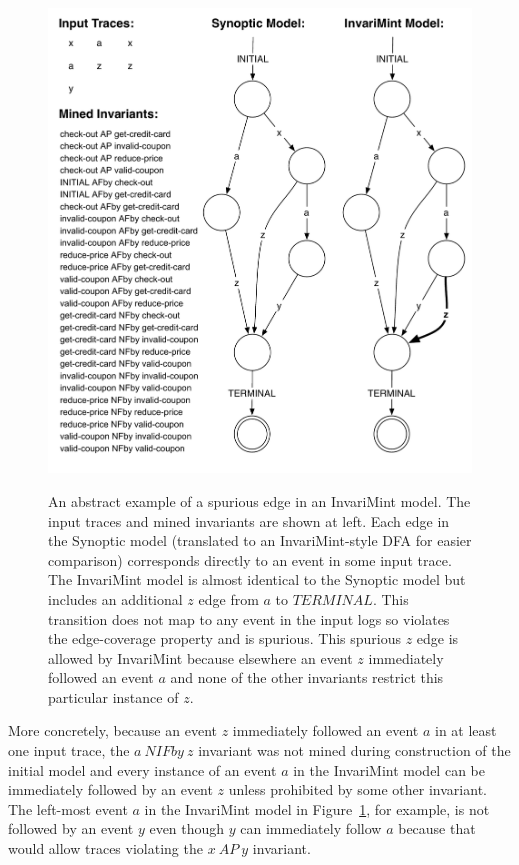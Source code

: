 \begin{figure}[t!]
   \center
   {\includegraphics[width=0.95\columnwidth]{fig/spurious.pdf}}
   \smallskip
   \caption{An abstract example of a spurious edge in an InvariMint model. The input traces
   and mined invariants are shown at left. Each edge in the Synoptic model
   (translated to an InvariMint-style DFA for easier comparison)
   corresponds directly to an event in some input trace. The InvariMint
   model is almost identical to the Synoptic model but includes an additional 
   $z$ edge from $a$ to $TERMINAL$. This transition does not map to any event in the
   input logs so violates the edge-coverage property and is spurious.
   This spurious $z$ edge is allowed by InvariMint because elsewhere an event
   $z$
   immediately followed an event $a$ and none of the other invariants restrict this
   particular instance of $z$.}
   \label{fig:spurious}
\end{figure}

More concretely, because an event $z$ immediately followed an event
$a$ in at least one input trace, the $a~NIFby~z$ invariant was not mined during
construction of 
the initial model and every instance of an event $a$ in the InvariMint model can be
immediately followed by an event $z$ unless prohibited by 
some other invariant. The left-most event $a$ in the InvariMint model in Figure~\ref{fig:spurious},
for example, is not followed by an event $y$ even though $y$ can immediately
follow $a$ because that would allow traces violating the 
$x~AP~y$ invariant.


